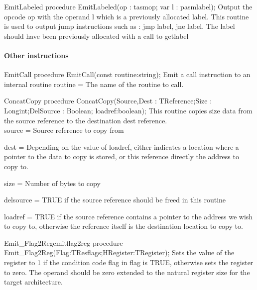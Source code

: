 \documentclass [12pt]{article}
\begin{document}
\begin{procedure}{EmitLabeled}
\Declaration
procedure EmitLabeled(op : tasmop; var l : pasmlabel);
\Description 
Output the opcode \textsf{op }with the operand \textsf{l} 
which is a previously allocated label. 
\Notes 
This routine is used to output jump instructions such as : jmp label, jne
label.  The label should have been previously allocated with a call to
\textsf{getlabel}

\end{procedure}

\paragraph{Other instructions}

\begin{function}{EmitCall}
\Declaration
procedure EmitCall(const routine:string);
\Description 
Emit a call instruction to an internal routine 
\Parameters
routine = The name of the routine to call.
\end{function}

\begin{procedure}{ConcatCopy}
\Declaration
procedure ConcatCopy(Source,Dest : TReference;Size : Longint;DelSource : Boolean; loadref:boolean);
\Description 
This routine copies \textsf{size} data from the \textsf{source} reference to the destination \textsf{dest} reference. \\
\Parameters 
source = Source reference to copy from \par 
dest = Depending on the value of loadref, either indicates a location where a 
pointer to the data to copy is stored, or this reference directly the address 
to copy to. \par 
size = Number of bytes to copy \par delsource = TRUE if the source reference 
should be freed in this routine \par loadref = TRUE if the source reference 
contains a pointer to the address we wish to copy to, otherwise the reference 
itself is the destination location to copy to. 
\end{procedure}

\begin{procedurel}{Emit{\_}Flag2Reg}{emitflag2reg}
\Declaration
procedure Emit{\_}Flag2Reg(Flag:TResflags;HRegister:TRegister);
\Description 
Sets the value of the register to 1 if the condition code flag in \textsf{flag}
is TRUE, otherwise sets the register to zero. 
\Notes 
The operand should be zero extended to the natural register size for the 
target architecture.
\end{procedurel}
\end{document}
